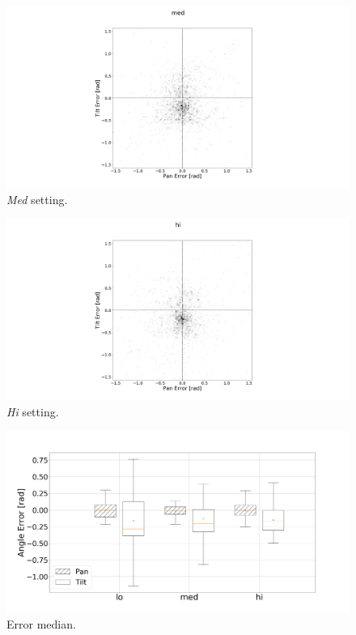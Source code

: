 \documentclass[sigconf, review=true, screen=true, anonymous=true]{acmart}
\begin{document}
\begin{figure}
  \centering
  \includegraphics[clip, trim=450 0 450 110, width=0.8\columnwidth]{figures/err_med.png}
  \caption{\emph{Med} setting. }\label{fig:err-results-med}
\end{figure}

\begin{figure}
  \centering
  \includegraphics[clip, trim=450 0 450 110, width=0.8\columnwidth]{figures/err_hi.png}
  \caption{\emph{Hi} setting. }\label{fig:err-results-hi}
\end{figure}

\begin{figure}
  \centering
  \includegraphics[clip, trim=20 -70 100 100, width=0.8\columnwidth]{figures/err_boxplot_medians.png}
  \caption{Error median.}\label{fig:err-boxplot-median}
\end{figure}
\end{document}
